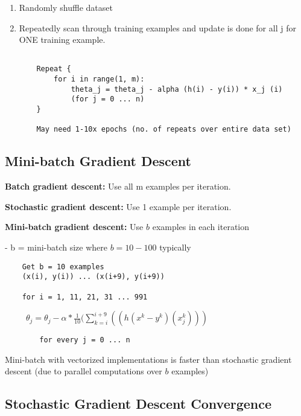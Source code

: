 \documentclass{article}
\begin{document}
\begin{enumerate}
    \item Randomly shuffle dataset
    \item Repeatedly scan through training examples and update is done for all j for ONE training example.
    
    \begin{verbatim}
    
    Repeat {
        for i in range(1, m):
            theta_j = theta_j - alpha (h(i) - y(i)) * x_j (i)
            (for j = 0 ... n)
    }
    
    May need 1-10x epochs (no. of repeats over entire data set)
    \end{verbatim}
\end{enumerate}


\subsection{Mini-batch Gradient Descent}

\textbf{Batch gradient descent:} Use all m examples per iteration.

\textbf{Stochastic gradient descent:} Use 1 example per iteration.


\textbf{Mini-batch gradient descent:} Use $b$ examples in each iteration 

- b = mini-batch size where $b = 10-100$ typically


\begin{verbatim}
    Get b = 10 examples 
    (x(i), y(i)) ... (x(i+9), y(i+9))
    
    for i = 1, 11, 21, 31 ... 991
    \end{verbatim}
   $\;\;\;\;\;\;\;\;\; \theta_j = \theta_j - \alpha * \frac{1}{10} (\sum_{k=i} ^ {i+9} ( (h(x^k - y^k) (x_j^k) ) )
    $
    
    \begin{verbatim}
        for every j = 0 ... n
    \end{verbatim}
    

Mini-batch with vectorized implementations is faster than stochastic gradient descent (due to parallel computations over $b$ examples)
    


\subsection{Stochastic Gradient Descent Convergence}
\end{document}
